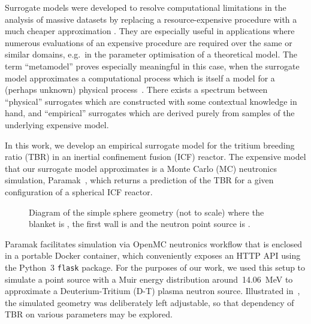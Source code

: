 Surrogate models were developed to resolve computational limitations in the analysis of massive datasets by replacing a resource-expensive procedure with a much cheaper approximation
\cite{Sondergaard2003}. They are especially useful in applications where
numerous evaluations of an expensive procedure are required over the same or
similar domains, e.g.~in the parameter optimisation of a theoretical model. The
term ``metamodel'' proves especially meaningful in this case, when the surrogate
model approximates a computational process which is itself a model for a
(perhaps unknown) physical process~\cite{Myers2002}. There exists a spectrum
between ``physical'' surrogates which are constructed with some contextual
knowledge in hand, and ``empirical'' surrogates which are derived purely from
samples of the underlying expensive model.

In this work, we develop an empirical surrogate model for the tritium breeding
ratio (TBR) in an inertial confinement fusion (ICF) reactor. The expensive model
that our surrogate model approximates is a Monte Carlo (MC) neutronics
simulation, Paramak~\cite{paramak}, which returns a prediction of the TBR for a given
configuration of a spherical ICF reactor.

\begin{figure}[!ht]
  \centering

    \caption{Diagram of the simple sphere geometry (not to scale) where the blanket is , the first wall is  and the neutron point source is .}
    \label{fig:model_diagram}
\end{figure}

Paramak facilitates simulation via OpenMC neutronics workflow that is enclosed in
a portable Docker container, which conveniently exposes an HTTP API using the
Python~3 \texttt{flask} package. For the purposes of our work, we used this setup to
simulate a point source with a Muir energy distribution \cite{openmcmuir}
around~\SI{14.06}{\mega\electronvolt} to approximate a Deuterium-Tritium (D-T)
plasma neutron source. Illustrated in~, the simulated
geometry was deliberately left adjustable, so that dependency of TBR on various
parameters may be explored.

